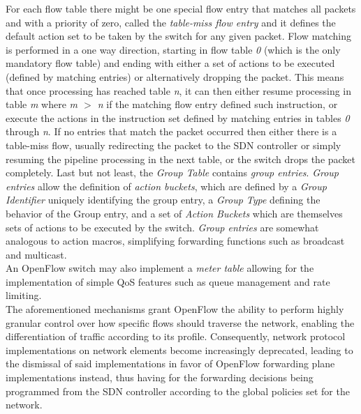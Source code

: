 %
For each flow table there might be one special flow entry that matches all packets and with a priority of zero, called the \emph{table-miss flow entry} and it defines the default action set to be taken by the switch for any given packet.
Flow matching is performed in a one way direction, starting in flow table \emph{0} (which is the only mandatory flow table) and ending with either a set of actions to be executed (defined by matching entries) or alternatively dropping the packet.
This means that once processing has reached table \emph{n}, it can then either resume processing in table \emph{m} where \emph{m $>$ n} if the matching flow entry defined such instruction, or execute the actions in the instruction set defined by matching entries in tables \emph{0} through \emph{n}.
If no entries that match the packet occurred then either there is a table-miss flow, usually redirecting the packet to the \gls{SDN} controller or simply resuming the pipeline processing in the next table, or the switch drops the packet completely.
%
Last but not least, the \emph{Group Table} contains \emph{group entries}.
\emph{Group entries} allow the definition of \emph{action buckets}, which are defined by a \emph{Group Identifier} uniquely identifying the group entry, a \emph{Group Type} defining the behavior of the Group entry, and a set of \emph{Action Buckets} which are themselves sets of actions to be executed by the switch.
\emph{Group entries} are somewhat analogous to action macros, simplifying forwarding functions such as broadcast and multicast\cite{OF13}.\\
%
An OpenFlow switch may also implement a \emph{meter table} allowing for the implementation of simple \gls{QoS} features such as queue management and rate limiting\cite{OF13}.\\
The aforementioned mechanisms grant OpenFlow the ability to perform highly granular control over how specific flows should traverse the network, enabling the differentiation of traffic according to its profile\cite{OFWP}.
Consequently, network protocol implementations on network elements become increasingly deprecated, leading to the dismissal of said implementations in favor of OpenFlow forwarding plane implementations instead, thus having for the forwarding decisions being programmed from the \gls{SDN} controller according to the global policies set for the network\cite{OFWP}.\\
%
